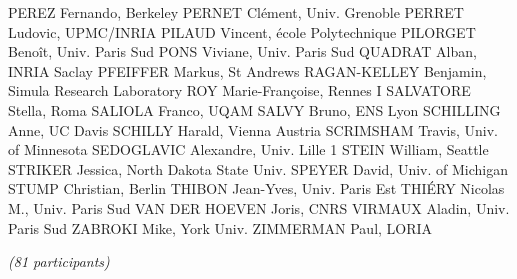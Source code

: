 \documentclass[12pt]{amsart}
\begin{document}
PEREZ Fernando, Berkeley
PERNET Clément, Univ. Grenoble
PERRET Ludovic, UPMC/INRIA
PILAUD Vincent, école Polytechnique
PILORGET Benoît, Univ. Paris Sud
PONS Viviane, Univ. Paris Sud
QUADRAT Alban, INRIA Saclay
PFEIFFER Markus, St Andrews
RAGAN-KELLEY Benjamin, Simula Research Laboratory
ROY Marie-Françoise, Rennes I
SALVATORE Stella, Roma
SALIOLA Franco, UQAM
SALVY Bruno, ENS Lyon
SCHILLING Anne, UC Davis
SCHILLY Harald, Vienna Austria
SCRIMSHAM Travis, Univ. of Minnesota
SEDOGLAVIC Alexandre, Univ. Lille 1
STEIN William, Seattle
STRIKER Jessica, North Dakota State Univ.
SPEYER David, Univ. of Michigan
STUMP Christian, Berlin
THIBON Jean-Yves, Univ. Paris Est
THIÉRY Nicolas M., Univ. Paris Sud
VAN DER HOEVEN Joris, CNRS
VIRMAUX Aladin, Univ. Paris Sud
ZABROKI Mike, York Univ.
ZIMMERMAN Paul, LORIA

\medskip
\emph{(81 participants)}
\end{document}
